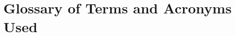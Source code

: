 \section*{Glossary of Terms and Acronyms Used}

\printglossary[type=\acronymtype]

\begin{description}
\end{description}
